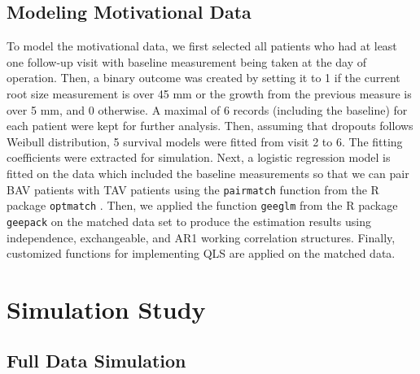\documentclass[
]{aft}
\begin{document}
\subsection{Modeling Motivational
Data}\label{modeling-motivational-data}

To model the motivational data, we first selected all patients who had
at least one follow-up visit with baseline measurement being taken at
the day of operation. Then, a binary outcome was created by setting it
to 1 if the current root size measurement is over 45 mm or the growth
from the previous measure is over 5 mm, and 0 otherwise. A maximal of 6
records (including the baseline) for each patient were kept for further
analysis. Then, assuming that dropouts follows Weibull distribution, 5
survival models were fitted from visit 2 to 6. The fitting coefficients
were extracted for simulation. Next, a logistic regression model is
fitted on the data which included the baseline measurements so that we
can pair BAV patients with TAV patients using the \texttt{pairmatch}
function from the R package \texttt{optmatch} \citep{optmatch}. Then, we
applied the function \texttt{geeglm} from the R package \texttt{geepack}
on the matched data set to produce the estimation results using
independence, exchangeable, and AR1 working correlation structures.
Finally, customized functions for implementing QLS are applied on the
matched data.

\section{Simulation Study}\label{simulation-study}

\subsection{Full Data Simulation}\label{full-data-simulation}
\end{document}
